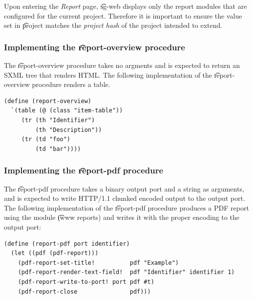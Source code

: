  Upon entering the \emph{Report} page, \t{sg-web} displays only the report
  modules that are configured for the current project.  Therefore it is
  important to ensure the value set in \t{project} matches the
  \emph{project hash} of the project intended to extend.

\subsubsection{Implementing the \t{report-overview} procedure}

  The \t{report-overview} procedure takes no argments and is expected to
  return an SXML tree that renders HTML.  The following implementation of
  the \t{report-overview} procedure renders a table.

\begin{siderules}
\begin{verbatim}
(define (report-overview)
  `(table (@ (class "item-table"))
     (tr (th "Identifier")
         (th "Description"))
     (tr (td "foo")
         (td "bar"))))
\end{verbatim}
\end{siderules}

\subsubsection{Implementing the \t{report-pdf} procedure}

  The \t{report-pdf} procedure takes a binary output port and a string as
  arguments, and is expected to write HTTP/1.1 chunked encoded output to
  the output port.  The following implementation of the \t{report-pdf}
  procedure produces a PDF report using the module \t{(www reports)}
  and writes it with the proper encoding to the output port:

\begin{siderules}
\begin{verbatim}
(define (report-pdf port identifier)
  (let ((pdf (pdf-report)))
    (pdf-report-set-title!          pdf "Example")
    (pdf-report-render-text-field!  pdf "Identifier" identifier 1)
    (pdf-report-write-to-port! port pdf #t)
    (pdf-report-close               pdf)))
\end{verbatim}
\end{siderules}
